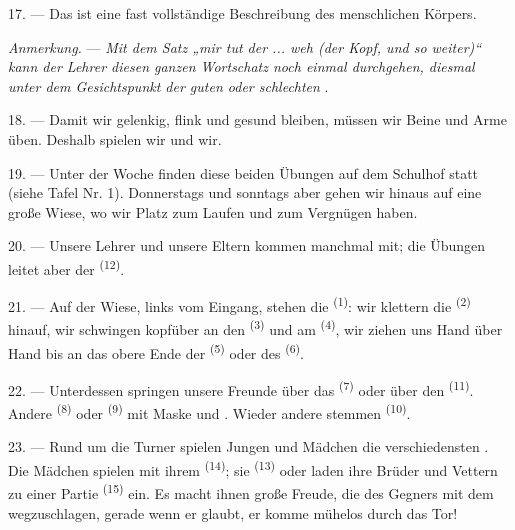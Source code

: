 17. --- Das ist eine fast vollständige Beschreibung des menschlichen Körpers.

\textit{Anmerkung.} --- \textit{Mit dem Satz „mir tut der ... weh (der Kopf, und
so weiter)“ kann der Lehrer diesen ganzen Wortschatz noch einmal durchgehen,
diesmal unter dem Gesichtspunkt der guten oder schlechten} .

\VUsaut{5.0mm}
\VUsaut{2.4mm}
\VUsaut{3.0mm}

18. --- Damit wir gelenkig, flink und gesund bleiben, müssen wir Beine und Arme
üben. Deshalb spielen wir und  wir.

19. --- Unter der Woche finden diese beiden Übungen auf dem Schulhof statt (siehe
Tafel Nr. 1). Donnerstags und sonntags aber gehen wir hinaus auf eine große Wiese,
wo wir Platz zum Laufen und zum Vergnügen haben.

20. --- Unsere Lehrer und unsere Eltern kommen manchmal mit; die Übungen leitet
aber der  \textsuperscript{(12)}.

21. --- Auf der Wiese, links vom Eingang, stehen die 
\textsuperscript{(1)}: wir klettern die  \textsuperscript{(2)} hinauf,
wir schwingen kopfüber an den  \textsuperscript{(3)} und am
 \textsuperscript{(4)}, wir ziehen uns Hand über Hand bis an das
obere Ende der  \textsuperscript{(5)} oder des
 \textsuperscript{(6)}.

22. --- Unterdessen springen unsere Freunde über das 
\textsuperscript{(7)} oder über den  \textsuperscript{(11)}. Andere
 \textsuperscript{(8)} oder  \textsuperscript{(9)} mit
Maske und . Wieder andere stemmen 
\textsuperscript{(10)}.

\VUsaut{4.6mm}
\VUsaut{3.0mm}

23. --- Rund um die Turner spielen Jungen und Mädchen die verschiedensten
. Die Mädchen spielen mit ihrem 
\textsuperscript{(14)}; sie  \textsuperscript{(13)} oder laden
ihre Brüder und Vettern zu einer Partie  \textsuperscript{(15)} ein.
Es macht ihnen große Freude, die  des Gegners mit dem
 wegzuschlagen, gerade wenn er glaubt, er komme mühelos durch
das Tor!

